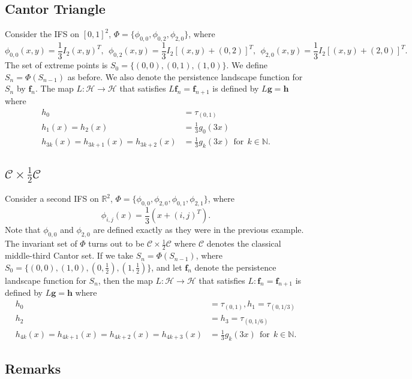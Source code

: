\documentclass [52pt] {article}
\newcommand{\R}{\mathbb{R}}
\newcommand{\Hil}{\mathcal{H}}
\begin{document}
\subsection{Cantor Triangle}
Consider the IFS on $[0,1]^2$, $\Phi = \{\phi_{0,0}, \phi_{0,2},\phi_{2,0}\}$, where
\[\phi_{0,0}(x,y) = \frac{1}{3}I_2(x,y)^T,\:\:\phi_{0,2}(x,y) = \frac{1}{3}I_2[(x,y)+(0,2)]^T,\:\:\phi_{2,0}(x,y) = \frac{1}{3}I_2[(x,y)+(2,0)]^T.\]
The set of extreme points is $S_0 = \{(0,0), (0,1),(1,0)\}$.  We define $S_n = \Phi(S_{n-1})$ as before.  We also denote the persistence landscape function for $S_n$ by $\mathbf{f}_n$.  The map $L:\Hil\to\Hil$ that satisfies $L\mathbf{f}_n = \mathbf{f}_{n+1}$ is defined by $L\mathbf{g} = \mathbf{h}$ where
\[\begin{split}
h_0 &= \tau_{(0,1)}\\
h_1(x) = h_2(x) &= \frac{1}{3}g_0(3x)\\
h_{3k}(x) = h_{3k+1}(x) = h_{3k+2}(x) &= \frac{1}{3}g_k(3x)\:\:\text{for}\:\:k\in\mathbb{N}.
\end{split}\]

\subsection{$\mathcal{C}\times\frac{1}{2}\mathcal{C}$}
Consider a second IFS on $\R^2$, $\Phi = \{\phi_{0,0}, \phi_{2,0}, \phi_{0,1}, \phi_{2,1}\}$, where
\[\phi_{i,j}(x) = \frac{1}{3}\left(x+(i,j)^T\right).\]
Note that $\phi_{0,0}$ and $\phi_{2,0}$ are defined exactly as they were in the previous example.  The invariant set of $\Phi$ turns out to be $\mathcal{C}\times\frac{1}{2}\mathcal{C}$ where $\mathcal{C}$ denotes the classical middle-third Cantor set.  If we take $S_n = \Phi(S_{n-1})$, where $S_0 = \{(0,0),(1,0),(0,\frac{1}{2}), (1,\frac{1}{2})\}$, and let $\mathbf{f}_n$ denote the persistence landscape function for $S_n$, then the map $L:\Hil\to\Hil$ that satisfies $L:\mathbf{f}_n = \mathbf{f}_{n+1}$ is defined by $L\mathbf{g} = \mathbf{h}$ where\[\begin{split}
h_0 &= \tau_{(0,1)}, h_1 = \tau_{(0,1/3)}\\
h_2 &= h_3 = \tau_{(0,1/6)}\\
h_{4k}(x) = h_{4k+1}(x) = h_{4k+2}(x) = h_{4k+3}(x) &= \frac{1}{3}g_k(3x)\:\:\text{for}\:\:k\in\mathbb{N}.
\end{split}\]

\subsection{Remarks}
\end{document}

